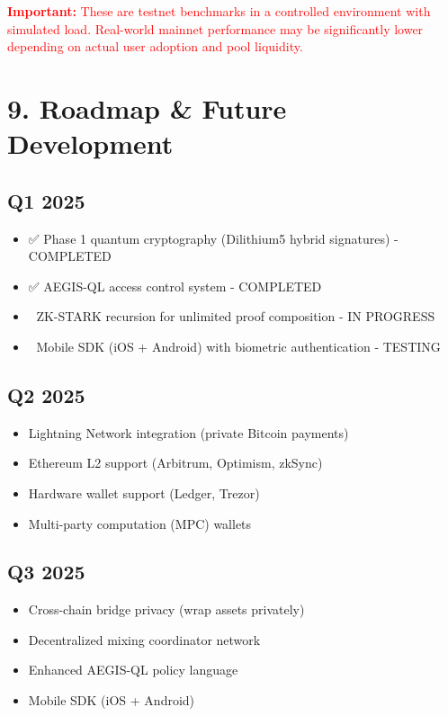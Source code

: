 \documentclass[11pt,a4paper]{article}
\begin{document}
\textcolor{red}{\textbf{Important:} These are testnet benchmarks in a controlled environment with simulated load. Real-world mainnet performance may be significantly lower depending on actual user adoption and pool liquidity.}

\section{9. Roadmap \& Future Development}

\subsection{Q1 2025}
\begin{itemize}
    \item ✅ Phase 1 quantum cryptography (Dilithium5 hybrid signatures) - COMPLETED
    \item ✅ AEGIS-QL access control system - COMPLETED
    \item 🔧 ZK-STARK recursion for unlimited proof composition - IN PROGRESS
    \item 🔧 Mobile SDK (iOS + Android) with biometric authentication - TESTING
\end{itemize}

\subsection{Q2 2025}
\begin{itemize}
    \item Lightning Network integration (private Bitcoin payments)
    \item Ethereum L2 support (Arbitrum, Optimism, zkSync)
    \item Hardware wallet support (Ledger, Trezor)
    \item Multi-party computation (MPC) wallets
\end{itemize}

\subsection{Q3 2025}
\begin{itemize}
    \item Cross-chain bridge privacy (wrap assets privately)
    \item Decentralized mixing coordinator network
    \item Enhanced AEGIS-QL policy language
    \item Mobile SDK (iOS + Android)
\end{itemize}
\end{document}

